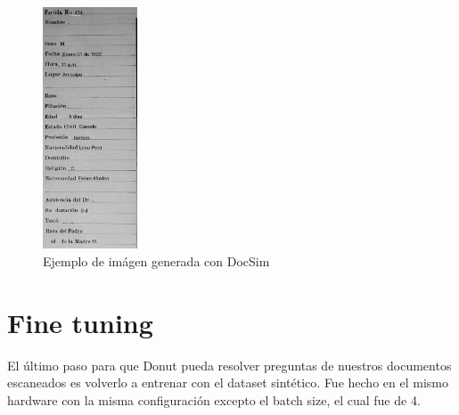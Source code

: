 \documentclass[../main.tex]{subfiles}
\begin{document}
\begin{figure}[H]
	\centering
	\includegraphics[width=0.25\textwidth]{006cc6cd159e46b5bf3c44c9545fbb25.jpg}
	\caption{Ejemplo de imágen generada con DocSim}
\end{figure}


\section{Fine tuning}

El último paso para que Donut pueda resolver preguntas de nuestros documentos escaneados es volverlo a entrenar con el dataset sintético. Fue hecho en el mismo hardware con la misma configuración excepto el batch size, el cual fue de 4.

\inputminted[bgcolor=codeBack, tabsize=2]{bash}{train-es-finetuned.sh}
\end{document}
